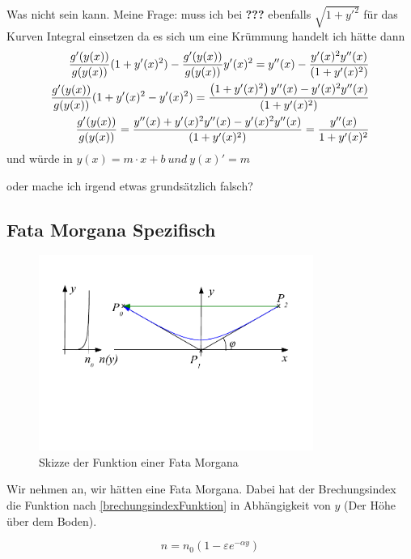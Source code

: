 Was nicht sein kann.
Meine Frage:
muss ich bei \textbf{???} ebenfalls $\sqrt{1 + y'^2}$ für das Kurven Integral einsetzen da es sich um eine Krümmung handelt 
ich hätte dann
\begin{align}
	\frac{g'(y(x))}{g(y(x))} (1 + y'(x)^2) - \frac{g'(y(x))}{g(y(x))} y'(x)^2 =  y''(x) - \frac{y'(x)^2 y''(x)}{(1 + y'(x)^2)} \notag \\
	\frac{g'(y(x))}{g(y(x))} (1 + y'(x)^2 - y'(x)^2) = \frac{\left(1 + y'(x)^2 \right)y''(x) - y'(x)^2 y''(x)}{(1 + y'(x)^2)} \notag \\
	\frac{g'(y(x))}{g(y(x))} = \frac{y''(x) + y'(x)^2 y''(x) - y'(x)^2 y''(x)}{(1 + y'(x)^2)} = \frac{y''(x)}{1 + y'(x)^2} \notag
\end{align}
und würde in $y(x) = m\cdot x + b \ und \ y(x)' = m$

oder mache ich irgend etwas grundsätzlich falsch?


\subsection{Fata Morgana Spezifisch}

\begin{figure}[H]
	\includegraphics[width=0.8\textwidth]{./picture/FataMorgana.pdf}
	\caption{Skizze der Funktion einer Fata Morgana}
	\label{Ab:fata}
\end{figure}


Wir nehmen an, wir hätten eine Fata Morgana. 
Dabei hat der Brechungsindex die Funktion nach \eqref{brechungsindexFunktion} in Abhängigkeit von $y$ 
(Der Höhe über dem Boden).

\begin{equation}
	n = n_0 (1 - \varepsilon e^{- \alpha y})
	\label{brechungsindexFunktion}
\end{equation}

